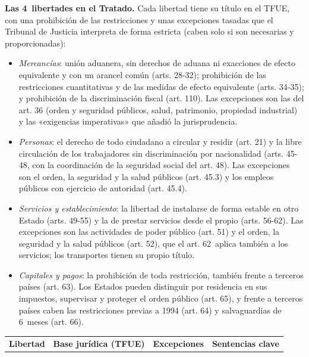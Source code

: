 \documentclass[11pt]{article}
\begin{document}
\begin{anotaciones}
\textbf{Las 4~libertades en el Tratado.} Cada libertad tiene su título en el TFUE, con una prohibición de las restricciones y unas excepciones tasadas que el Tribunal de Justicia interpreta de forma estricta (caben solo si son necesarias y proporcionadas):
\begin{itemize}
\item \emph{Mercancías}: unión aduanera, sin derechos de aduana ni exacciones de efecto equivalente y con un arancel común (arts. 28-32); prohibición de las restricciones cuantitativas y de las medidas de efecto equivalente (arts. 34-35); y prohibición de la discriminación fiscal (art. 110). Las excepciones son las del art. 36 (orden y seguridad públicos, salud, patrimonio, propiedad industrial) y las «exigencias imperativas» que añadió la jurisprudencia.
\item \emph{Personas}: el derecho de todo ciudadano a circular y residir (art. 21) y la libre circulación de los trabajadores sin discriminación por nacionalidad (arts. 45-48, con la coordinación de la seguridad social del art. 48). Las excepciones son el orden, la seguridad y la salud públicos (art. 45.3) y los empleos públicos con ejercicio de autoridad (art. 45.4).
\item \emph{Servicios y establecimiento}: la libertad de instalarse de forma estable en otro Estado (arts. 49-55) y la de prestar servicios desde el propio (arts. 56-62). Las excepciones son las actividades de poder público (art. 51) y el orden, la seguridad y la salud públicos (art. 52), que el art. 62~aplica también a los servicios; los transportes tienen su propio título.
\item \emph{Capitales y pagos}: la prohibición de toda restricción, también frente a terceros países (art. 63). Los Estados pueden distinguir por residencia en sus impuestos, supervisar y proteger el orden público (art. 65), y frente a terceros países caben las restricciones previas a 1994 (art. 64) y salvaguardias de 6~meses (art. 66).
\end{itemize}
\begin{tablacaja}
\centering
\caption{Las 4~libertades: base jurídica, excepciones y jurisprudencia básica}\label{tab:libertades}
\small
\begin{tabular}{>{\raggedright\arraybackslash}p{2.4cm}>{\raggedright\arraybackslash}p{3.2cm}>{\raggedright\arraybackslash}p{3.5cm}>{\raggedright\arraybackslash}p{4.3cm}}
\hline
\textbf{Libertad} & \textbf{Base jurídica (TFUE)} & \textbf{Excepciones} & \textbf{Sentencias clave}\\

\end{tabular}
\end{tablacaja}
\end{anotaciones}
\end{document}
